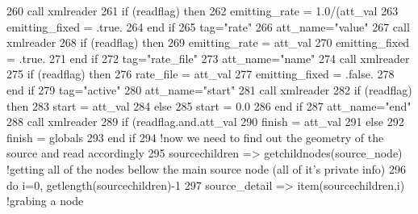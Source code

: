 \begin{DoxyCode}
260         \textcolor{keyword}{call }xmlreader%
261         \textcolor{keywordflow}{if} (readflag) \textcolor{keywordflow}{then}
262             emitting\_rate = 1.0/(att\_val%
263             emitting\_fixed = .true.
264 \textcolor{keywordflow}{        end if}
265         tag=\textcolor{stringliteral}{"rate"}
266         att\_name=\textcolor{stringliteral}{"value"}
267         \textcolor{keyword}{call }xmlreader%
268         \textcolor{keywordflow}{if} (readflag) \textcolor{keywordflow}{then}
269             emitting\_rate = att\_val%
270             emitting\_fixed = .true.
271 \textcolor{keywordflow}{        end if}
272         tag=\textcolor{stringliteral}{"rate\_file"}
273         att\_name=\textcolor{stringliteral}{"name"}
274         \textcolor{keyword}{call }xmlreader%
275         \textcolor{keywordflow}{if} (readflag) \textcolor{keywordflow}{then}
276             rate\_file = att\_val
277             emitting\_fixed = .false.
278 \textcolor{keywordflow}{        end if}
279         tag=\textcolor{stringliteral}{"active"}
280         att\_name=\textcolor{stringliteral}{"start"}
281         \textcolor{keyword}{call }xmlreader%
282         \textcolor{keywordflow}{if} (readflag) \textcolor{keywordflow}{then}
283             start = att\_val%
284         \textcolor{keywordflow}{else}
285             start = 0.0
286 \textcolor{keywordflow}{        end if}
287         att\_name=\textcolor{stringliteral}{"end"}
288         \textcolor{keyword}{call }xmlreader%
289         \textcolor{keywordflow}{if} (readflag.and.att\_val%
290             finish = att\_val%
291         \textcolor{keywordflow}{else}
292             finish = globals%
293 \textcolor{keywordflow}{        end if}
294         \textcolor{comment}{!now we need to find out the geometry of the source and read accordingly}
295         sourcechildren => getchildnodes(source\_node) \textcolor{comment}{!getting all of the nodes bellow the main source node
       (all of it's private info)}
296         \textcolor{keywordflow}{do} i=0, getlength(sourcechildren)-1
297             source\_detail => item(sourcechildren,i) \textcolor{comment}{!grabing a node}

\end{DoxyCode}
